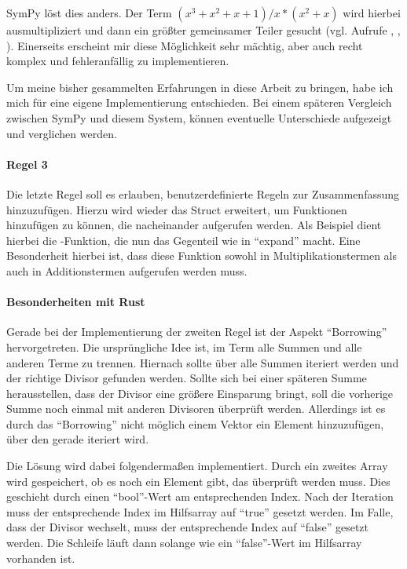 \documentclass[11pt,a4paper, ngerman]{article}
\begin{document}
SymPy löst dies anders. Der Term $(x^3+x^2+x+1)/x*(x^2+x)$ wird hierbei ausmultipliziert und dann ein größter gemeinsamer Teiler gesucht (vgl. \cite{SymPySimplifySrc} Aufrufe , , ). Einerseits erscheint mir diese Möglichkeit sehr mächtig, aber auch recht komplex und fehleranfällig zu implementieren.

Um meine bisher gesammelten Erfahrungen in diese Arbeit zu bringen, habe ich mich für eine eigene Implementierung entschieden. Bei einem späteren Vergleich zwischen SymPy und diesem System, können eventuelle Unterschiede aufgezeigt und verglichen werden.

\paragraph{Regel 3} Die letzte Regel soll es erlauben, benutzerdefinierte Regeln zur Zusammenfassung hinzuzufügen. Hierzu wird wieder das Struct  erweitert, um Funktionen hinzufügen zu können, die nacheinander aufgerufen werden. Als Beispiel dient hierbei die -Funktion, die nun das Gegenteil wie in ``expand'' macht. Eine Besonderheit hierbei ist, dass diese Funktion sowohl in Multiplikationstermen als auch in Additionstermen aufgerufen werden muss.

\paragraph{Besonderheiten mit Rust} Gerade bei der Implementierung der zweiten Regel ist der Aspekt ``Borrowing'' hervorgetreten. Die ursprüngliche Idee ist, im Term alle Summen und alle anderen Terme zu trennen. Hiernach sollte über alle Summen iteriert werden und der richtige Divisor gefunden werden. Sollte sich bei einer späteren Summe herausstellen, dass der Divisor eine größere Einsparung bringt, soll die vorherige Summe noch einmal mit anderen Divisoren überprüft werden. Allerdings ist es durch das ``Borrowing'' nicht möglich einem Vektor ein Element hinzuzufügen, über den gerade iteriert wird.

Die Lösung wird dabei folgendermaßen implementiert. Durch ein zweites Array wird gespeichert, ob es noch ein Element gibt, das überprüft werden muss. Dies geschieht durch einen ``bool''-Wert am entsprechenden Index. Nach der Iteration muss der entsprechende Index im Hilfsarray auf ``true'' gesetzt werden. Im Falle, dass der Divisor wechselt, muss der entsprechende Index auf ``false'' gesetzt werden. Die Schleife läuft dann solange wie ein ``false''-Wert im Hilfsarray vorhanden ist.
\end{document}
